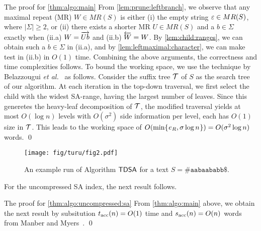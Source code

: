 \begin{statement}{The proof for \cref{thm:algo:main}}
  From \cref{lem:prune:leftbranch}, we observe that any maximal repeat (MR) $W \in MR(S)$ is either (i) the empty string $\varepsilon \in MR(S)$, where $|\Sigma|\ge 2$, or (ii) there exists a shorter MR $U \in MR(S)$ and a $b \in \Sigma$ exactly when (ii.a) $W = \overrightarrow{Ub}$ and (ii.b) $\overleftarrow{W} = W$.
  By \cref{lem:child:ranges}, we can obtain such a $b \in \Sigma$ in (ii.a), and by \cref{lem:leftmaximal:character}, we can make test in (ii.b) in $O(1)$ time. 
  Combining the above arguments, the correctness and time complexities follows. 
  To bound the working space, we use the technique by Belazzougui \textit{et al.}~\cite[Lemma~4.2]{belazzougui2020linear} as follows. Consider the suffix tree $\mathcal{T}$ of $S$ as the search tree of our algorithm. At each iteration in the top-down traversal, we first select the child with the widest SA-range, having the largest number of leaves. Since this generetes the heavy-leaf decomposition of $\mathcal{T}$, the modified traversal yields at most $O(\log n)$ levels with $O(\sigma^2)$ side information per level, each has $O(1)$ size in $\mathcal{T}$. This leads to the working space of $O(\min\{\kern0.05eme_R, \sigma\log n\kern0.05em\}) = O(\sigma^2\log n)$ words. \qed 
\end{statement}

\begin{figure}[t]
\centering  
  \texttt{[image: fig/turu/fig2.pdf]}
  \caption{An example run of Algorithm $\textsf{TDSA}$ for a text $S = \mathtt{\#aabaababb\$}$.
}\label{fig:run:example}
\end{figure}


For the uncompressed SA index, the next result follows. 

\begin{statement}{The proof for \cref{thm:algo:uncompressed:sa}}
  From \cref{thm:algo:main} above, we obtain the next result by subsitution $t_{\mathrm{acc}}(n) = O(1)$ time and $s_{\mathrm{acc}}(n) = O(n)$ words from Manber and Myers~\cite{manber:myers1993suffixarrays}.
  \qed 
\end{statement}

